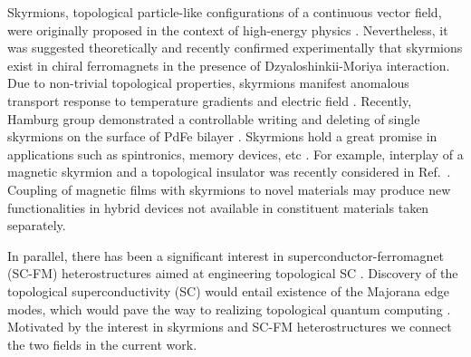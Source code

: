 \documentclass[twocolumn,showpacs,floatfix,longbibliography]{revtex4-1}
\begin{document}
Skyrmions, topological particle-like configurations of a continuous vector field, were originally proposed in the context of high-energy physics \cite{Skyrme}.  Nevertheless, it was suggested theoretically \cite{Bogdanov1989,Rossler2006} and recently confirmed experimentally \cite{Muhlbauer2009,Munzer2010,Yu2011,Heinze2011,Seki2012} that skyrmions exist in chiral ferromagnets in the presence of Dzyaloshinkii-Moriya interaction. Due to non-trivial topological properties, skyrmions manifest anomalous transport response to temperature gradients \cite{Jonietz2010} and electric field \cite{Neubauer2009,Zang2011,Saxena2013}. Recently, Hamburg group demonstrated a controllable writing and deleting of single skyrmions on the surface of PdFe bilayer \cite{Romming2013,Bergmann2014,Romming2015}.  Skyrmions hold a great promise in applications such as spintronics, memory devices, etc \cite{Fert2013,Nagaosa2013}. For example, interplay of a magnetic skyrmion and a topological insulator was recently considered in Ref.~\cite{Hurst2015}. Coupling of magnetic films with skyrmions to novel materials may produce new functionalities in hybrid devices not available in constituent materials taken separately.


In parallel, there has been a significant  interest  in superconductor-ferromagnet (SC-FM) heterostructures aimed at engineering topological SC \cite{Alicea2012,Beenakker}. Discovery of the topological superconductivity (SC) would entail existence of the Majorana edge modes, which would pave the way to realizing topological quantum computing \cite{Nayak2008}. Motivated by the interest in skyrmions and SC-FM heterostructures  we connect the two fields in the current work. 
\end{document}
